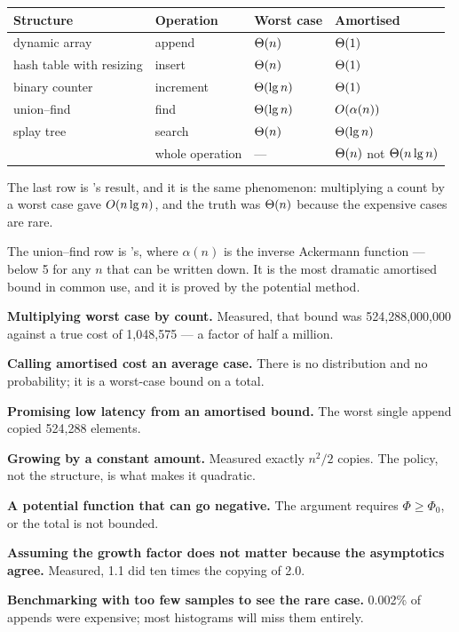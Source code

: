 \begin{conceptbox}
\begin{longtable}{@{}L{3.8cm}L{3.4cm}L{3.0cm}L{3.4cm}@{}}
\toprule
{}
\textbf{Structure} & \textbf{Operation} & \textbf{Worst case} &
\textbf{Amortised} \\
\midrule
\endhead
dynamic array & append & $\Theta(n)$ & $\Theta(1)$ \\
hash table with resizing & insert & $\Theta(n)$ & $\Theta(1)$ \\
binary counter & increment & $\Theta(\operatorname{lg} n)$ & $\Theta(1)$ \\
union--find & find & $\Theta(\operatorname{lg} n)$ & $O(\alpha(n))$ \\
splay tree & search & $\Theta(n)$ & $\Theta(\operatorname{lg} n)$ \\
 & whole operation & --- & $\Theta(n)$ not
  $\Theta(n\operatorname{lg} n)$ \\
\bottomrule
\end{longtable}

\smallskip
The last row is 's result, and it is the same phenomenon:
multiplying a count by a worst case gave $O(n\operatorname{lg} n)$, and the truth was
$\Theta(n)$ because the expensive cases are rare.

\smallskip
The union--find row is 's, where $\alpha(n)$ is the inverse
Ackermann function --- below 5 for any $n$ that can be written down. It is the
most dramatic amortised bound in common use, and it is proved by the potential
method.
\end{conceptbox}

\begin{pitfall}
\begin{tight}
  \item \textbf{Multiplying worst case by count.} Measured, that bound was
        524{,}288{,}000{,}000 against a true cost of 1{,}048{,}575 --- a
        factor of half a million.
  \item \textbf{Calling amortised cost an average case.} There is no
        distribution and no probability; it is a worst-case bound on a total.
  \item \textbf{Promising low latency from an amortised bound.} The worst
        single append copied 524{,}288 elements.
  \item \textbf{Growing by a constant amount.} Measured exactly $n^{2}/2$
        copies. The policy, not the structure, is what makes it quadratic.
  \item \textbf{A potential function that can go negative.} The argument
        requires $\Phi \ge \Phi_{0}$, or the total is not bounded.
  \item \textbf{Assuming the growth factor does not matter because the
        asymptotics agree.} Measured, 1.1 did ten times the copying of 2.0.
  \item \textbf{Benchmarking with too few samples to see the rare case.} 0.002\%
        of appends were expensive; most histograms will miss them entirely.
\end{tight}
\end{pitfall}

